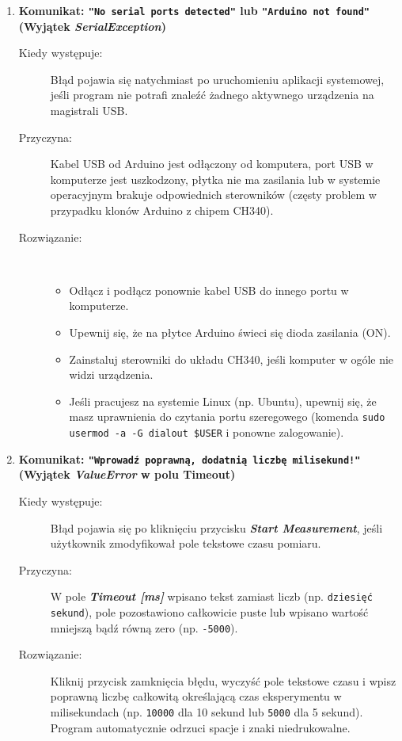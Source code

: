 \documentclass[a4paper,12pt]{article}
\begin{document}
\begin{enumerate}
    \item \textbf{Komunikat: \texttt{"No serial ports detected"} lub \texttt{"Arduino not found"} (Wyjątek \textit{SerialException})}
    \begin{description}
        \item[Kiedy występuje:] Błąd pojawia się natychmiast po uruchomieniu aplikacji systemowej, jeśli program nie potrafi znaleźć żadnego aktywnego urządzenia na magistrali USB.
        \item[Przyczyna:] Kabel USB od Arduino jest odłączony od komputera, port USB w komputerze jest uszkodzony, płytka nie ma zasilania lub w systemie operacyjnym brakuje odpowiednich sterowników (częsty problem w przypadku klonów Arduino z chipem CH340).
        \item[Rozwiązanie:] \
        \begin{itemize}
            \item Odłącz i podłącz ponownie kabel USB do innego portu w komputerze.
            \item Upewnij się, że na płytce Arduino świeci się dioda zasilania (ON).
            \item Zainstaluj sterowniki do układu CH340, jeśli komputer w ogóle nie widzi urządzenia.
            \item Jeśli pracujesz na systemie Linux (np. Ubuntu), upewnij się, że masz uprawnienia do czytania portu szeregowego (komenda \texttt{sudo usermod -a -G dialout \$USER} i ponowne zalogowanie).
        \end{itemize}
    \end{description}

    \item \textbf{Komunikat: \texttt{"Wprowadź poprawną, dodatnią liczbę milisekund!"} (Wyjątek \textit{ValueError} w polu Timeout)}
    \begin{description}
        \item[Kiedy występuje:] Błąd pojawia się po kliknięciu przycisku \textbf{\textit{Start Measurement}}, jeśli użytkownik zmodyfikował pole tekstowe czasu pomiaru.
        \item[Przyczyna:] W pole \textbf{\textit{Timeout [ms]}} wpisano tekst zamiast liczb (np. \texttt{dziesięć sekund}), pole pozostawiono całkowicie puste lub wpisano wartość mniejszą bądź równą zero (np. \texttt{-5000}).
        \item[Rozwiązanie:] Kliknij przycisk zamknięcia błędu, wyczyść pole tekstowe czasu i wpisz poprawną liczbę całkowitą określającą czas eksperymentu w milisekundach (np. \texttt{10000} dla 10 sekund lub \texttt{5000} dla 5 sekund). Program automatycznie odrzuci spacje i znaki niedrukowalne.
    \end{description}


\end{enumerate}
\end{document}
